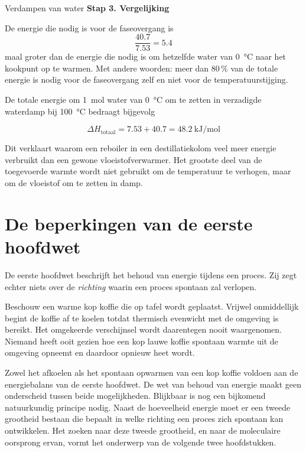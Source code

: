 \begin{voorbeeld}{Verdampen van water}
\textbf{Stap 3. Vergelijking}

De energie die nodig is voor de faseovergang is
\[
\frac{40.7}{7.53}
=
5.4
\]
maal groter dan de energie die nodig is om hetzelfde water van \SI{0}{\celsius} naar het kookpunt op te warmen. Met andere woorden: meer dan 80\,\% van de totale energie is nodig voor de faseovergang zelf en niet voor de temperatuurstijging.

\bigskip

De totale energie om \SI{1}{\mole} water van \SI{0}{\celsius} om te zetten in verzadigde waterdamp bij \SI{100}{\celsius} bedraagt bijgevolg

\[
\Delta H_{\mathrm{totaal}} = 7.53+40.7 = \SI{48.2}{\kilo\joule\per\mole}
\]

Dit verklaart waarom een reboiler in een destillatiekolom veel meer energie verbruikt dan een gewone vloeistofverwarmer. Het grootste deel van de toegevoerde warmte wordt niet gebruikt om de temperatuur te verhogen, maar om de vloeistof om te zetten in damp.

\end{voorbeeld}

\section{De beperkingen van de eerste hoofdwet}

De eerste hoofdwet beschrijft het behoud van energie tijdens een proces. Zij zegt echter niets over de \emph{richting} waarin een proces spontaan zal verlopen.

Beschouw een warme kop koffie die op tafel wordt geplaatst. Vrijwel onmiddellijk begint de koffie af te koelen totdat thermisch evenwicht met de omgeving is bereikt. Het omgekeerde verschijnsel wordt daarentegen nooit waargenomen. Niemand heeft ooit gezien hoe een kop lauwe koffie spontaan warmte uit de omgeving opneemt en daardoor opnieuw heet wordt.

Zowel het afkoelen als het spontaan opwarmen van een kop koffie voldoen aan de energiebalans van de eerste hoofdwet. De wet van behoud van energie maakt geen onderscheid tussen beide mogelijkheden. Blijkbaar is nog een bijkomend natuurkundig principe nodig. Naast de hoeveelheid energie moet er een tweede grootheid bestaan die bepaalt in welke richting een proces zich spontaan kan ontwikkelen. Het zoeken naar deze tweede grootheid, en naar de moleculaire oorsprong ervan, vormt het onderwerp van de volgende twee hoofdstukken.

\newpage
